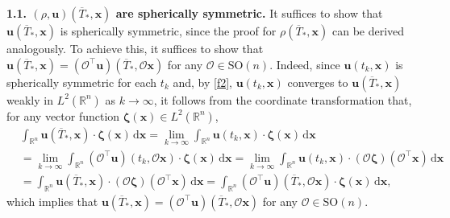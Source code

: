 \documentclass[11pt,reqno]{amsart}
\numberwithin{rk}{section}
\numberwithin{prop}{section}
\numberwithin{mydef}{section}
\numberwithin{lem}{section}
\numberwithin{equation}{section}
\numberwithin{thm}{section}
\begin{document}
\smallskip
\textbf{1.1. $(\rho,\boldsymbol{u})(\overline{T}_*,\boldsymbol{x})$ are spherically symmetric.} 
It suffices to show that $\boldsymbol{u}(\overline{T}_*,\boldsymbol{x})$ is spherically symmetric, 
since the proof for $\rho(\overline{T}_*,\boldsymbol{x})$ can be derived analogously. 
To achieve this, it suffices to show that 
$\boldsymbol{u}(\overline{T}_*,\boldsymbol{x})=(\mathcal{O}^\top\boldsymbol{u})(\overline{T}_*,\mathcal{O}\boldsymbol{x})$ for any $\mathcal{O}\in \mathrm{SO}(n)$. 
Indeed, since $\boldsymbol{u}(t_k,\boldsymbol{x})$ is spherically symmetric for each $t_k$ and, by \eqref{f2}, $\boldsymbol{u}(t_k,\boldsymbol{x})$ converges to $\boldsymbol{u}(\overline{T}_*,\boldsymbol{x})$ weakly in $L^2(\mathbb{R}^n)$ as $k\to \infty$, it follows from the coordinate transformation that, 
for any vector function $\boldsymbol{\zeta}(\boldsymbol{x})\in L^2(\mathbb{R}^n)$,
\begin{align*}
&\int_{\mathbb{R}^n} \boldsymbol{u}(\overline{T}_*,\boldsymbol{x})\cdot \boldsymbol{\zeta}(\boldsymbol{x})\,\mathrm{d}\boldsymbol{x}=\lim_{k\to\infty}\int_{\mathbb{R}^n}\boldsymbol{u}(t_k,\boldsymbol{x})\cdot \boldsymbol{\zeta}(\boldsymbol{x})\,\mathrm{d}\boldsymbol{x}\\
&=\lim_{k\to\infty}\int_{\mathbb{R}^n}(\mathcal{O}^\top\boldsymbol{u})(t_k,\mathcal{O}\boldsymbol{x})\cdot \boldsymbol{\zeta}(\boldsymbol{x})\,\mathrm{d}\boldsymbol{x}=\lim_{k\to\infty}\int_{\mathbb{R}^n}\boldsymbol{u}(t_k,\boldsymbol{x})\cdot (\mathcal{O}\boldsymbol{\zeta})(\mathcal{O}^\top\boldsymbol{x})\,\mathrm{d}\boldsymbol{x}\\
&=\int_{\mathbb{R}^n}\boldsymbol{u}(\overline{T}_*,\boldsymbol{x})\cdot (\mathcal{O}\boldsymbol{\zeta})(\mathcal{O}^\top\boldsymbol{x})\,\mathrm{d}\boldsymbol{x}=\int_{\mathbb{R}^n}(\mathcal{O}^\top\boldsymbol{u})(\overline{T}_*,\mathcal{O}\boldsymbol{x})\cdot \boldsymbol{\zeta}(\boldsymbol{x})\,\mathrm{d}\boldsymbol{x},
\end{align*}
which implies that 
$\boldsymbol{u}(\overline{T}_*,\boldsymbol{x})=(\mathcal{O}^\top\boldsymbol{u})(\overline{T}_*,\mathcal{O}\boldsymbol{x})$ for any $\mathcal{O}\in \mathrm{SO}(n)$.
\end{document}
